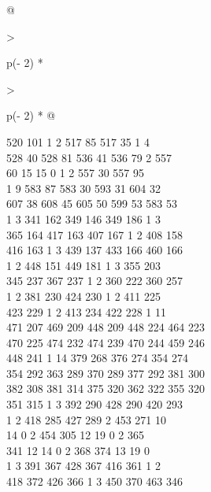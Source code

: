 \begin{question}
\begin{longtable}[]{@{}

  >{\raggedright\arraybackslash}p{(\columnwidth - 2\tabcolsep) * }

  >{\raggedright\arraybackslash}p{(\columnwidth - 2\tabcolsep) * }@{}}
\begin{minipage}[t]{\linewidth}
520 101 1 2 517 85 517 35 1 4\\

528 40 528 81 536 41 536 79 2 557\\

60 15 15 0 1 2 557 30 557 95\\

1 9 583 87 583 30 593 31 604 32\\

607 38 608 45 605 50 599 53 583 53\\

1 3 341 162 349 146 349 186 1 3\\

365 164 417 163 407 167 1 2 408 158\\

416 163 1 3 439 137 433 166 460 166\\

1 2 448 151 449 181 1 3 355 203\\

345 237 367 237 1 2 360 222 360 257\\

1 2 381 230 424 230 1 2 411 225\\

423 229 1 2 413 234 422 228 1 11\\

471 207 469 209 448 209 448 224 464 223\\

470 225 474 232 474 239 470 244 459 246\\

448 241 1 14 379 268 376 274 354 274\\

354 292 363 289 370 289 377 292 381 300\\

382 308 381 314 375 320 362 322 355 320\\

351 315 1 3 392 290 428 290 420 293\\

1 2 418 285 427 289 2 453 271 10\\

14 0 2 454 305 12 19 0 2 365\\

341 12 14 0 2 368 374 13 19 0\\

1 3 391 367 428 367 416 361 1 2\\

418 372 426 366 1 3 450 370 463 346\\


\end{minipage}
\end{longtable}
\end{question}
